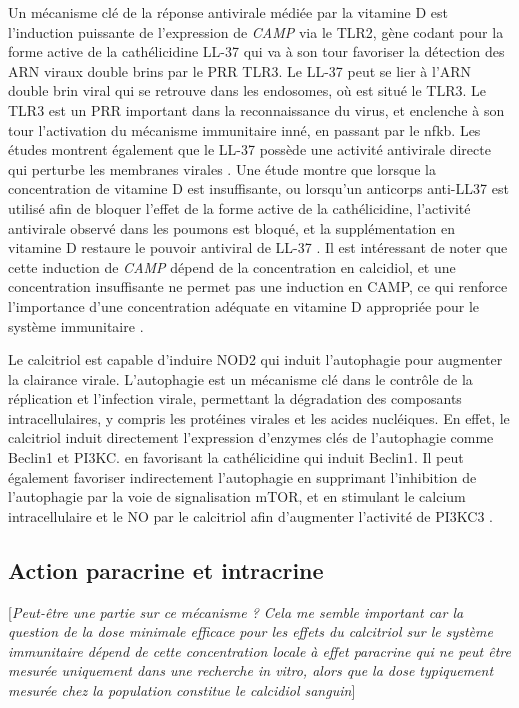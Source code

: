 \documentclass[
  a4paper,
  DIV=11,
  numbers=noendperiod,
  listof=totoc]{scrreprt}
\begin{document}
Un mécanisme clé de la réponse antivirale médiée par la vitamine D est
l'induction puissante de l'expression de \emph{CAMP} via le TLR2, gène
codant pour la forme active de la cathélicidine LL-37 qui va à son tour
favoriser la détection des ARN viraux double brins par le \ac{PRR} TLR3.
Le LL-37 peut se lier à l'ARN double brin viral qui se retrouve dans les
endosomes, où est situé le TLR3. Le TLR3 est un \ac{PRR} important dans
la reconnaissance du virus, et enclenche à son tour l'activation du
mécanisme immunitaire inné, en passant par le \ac{nfkb}. Les études
montrent également que le LL-37 possède une activité antivirale directe
qui perturbe les membranes virales \autocite{Bishop.2021}. Une étude
montre que lorsque la concentration de vitamine D est insuffisante, ou
lorsqu'un anticorps anti-LL37 est utilisé afin de bloquer l'effet de la
forme active de la cathélicidine, l'activité antivirale observé dans les
poumons est bloqué, et la supplémentation en vitamine D restaure le
pouvoir antiviral de LL-37 \autocite{Buonfiglio.2017}. Il est
intéressant de noter que cette induction de \emph{CAMP} dépend de la
concentration en calcidiol, et une concentration insuffisante ne permet
pas une induction en CAMP, ce qui renforce l'importance d'une
concentration adéquate en vitamine D appropriée pour le système
immunitaire \autocite{White.2022}.

Le calcitriol est capable d'induire NOD2 qui induit l'autophagie pour
augmenter la clairance virale. L'autophagie est un mécanisme clé dans le
contrôle de la réplication et l'infection virale, permettant la
dégradation des composants intracellulaires, y compris les protéines
virales et les acides nucléiques. En effet, le calcitriol induit
directement l'expression d'enzymes clés de l'autophagie comme Beclin1 et
PI3KC. en favorisant la cathélicidine qui induit Beclin1. Il peut
également favoriser indirectement l'autophagie en supprimant
l'inhibition de l'autophagie par la voie de signalisation mTOR, et en
stimulant le calcium intracellulaire et le \ac{NO} par le calcitriol
afin d'augmenter l'activité de PI3KC3 \autocite{Bishop.2021}.

\subsection{Action paracrine et
intracrine}\label{action-paracrine-et-intracrine}

{[}\emph{Peut-être une partie sur ce mécanisme ? Cela me semble
important car la question de la dose minimale efficace pour les effets
du calcitriol sur le système immunitaire dépend de cette concentration
locale à effet paracrine qui ne peut être mesurée uniquement dans une
recherche in vitro, alors que la dose typiquement mesurée chez la
population constitue le calcidiol sanguin}{]}
\end{document}
